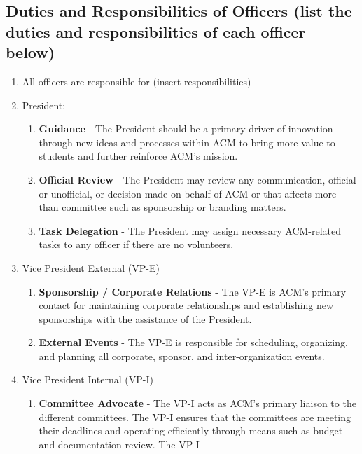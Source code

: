   \subsection{Duties and Responsibilities of Officers (list the duties and
  responsibilities of each officer below)}
    \begin{enumerate}[label=\arabic*.]
      \item All officers are responsible for (insert responsibilities)
      \item President:
        \begin{enumerate}[label=\alph*.]
          \item \textbf{Guidance} - The President should be a primary driver of
            innovation through new ideas and processes within ACM to bring more
            value to students and further reinforce ACM's mission.
          \item \textbf{Official Review} - The President may review any
            communication, official or unofficial, or decision made on behalf of
            ACM or that affects more than committee such as sponsorship or
            branding matters.
          \item \textbf{Task Delegation} - The President may assign necessary
            ACM-related tasks to any officer if there are no volunteers.
        \end{enumerate}
      \item Vice President External (VP-E)
        \begin{enumerate}[label=\alph*.]
          \item \textbf{Sponsorship / Corporate Relations} - The VP-E is ACM's
            primary contact for maintaining corporate relationships and
            establishing new sponsorships with the assistance of the President. 
          \item \textbf{External Events} - The VP-E is responsible for
            scheduling, organizing, and planning all corporate, sponsor, and
            inter-organization events.
        \end{enumerate}
      \item Vice President Internal (VP-I)
        \begin{enumerate}[label=\alph*.]
          \item \textbf{Committee Advocate} - The VP-I acts as ACM's primary
            liaison to the different committees. The VP-I ensures that the
            committees are meeting their deadlines and operating efficiently
            through means such as budget and documentation review. The VP-I

\end{enumerate}
\end{enumerate}
